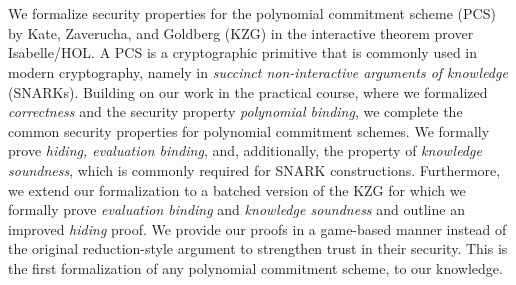\chapter{\abstractname}

We formalize security properties for the polynomial commitment scheme (PCS) by Kate, Zaverucha, and Goldberg (KZG) in the interactive theorem prover Isabelle/HOL. A PCS is a cryptographic primitive that is commonly used in modern cryptography, namely in \textit{succinct non-interactive arguments of knowledge} (SNARKs). 
Building on our work in the practical course, where we formalized \textit{correctness} and the security property \textit{polynomial binding}, we complete the common security properties for polynomial commitment schemes. We formally prove \textit{hiding, evaluation binding}, and, additionally, the property of \textit{knowledge soundness}, which is commonly required for SNARK constructions.
Furthermore, we extend our formalization to a batched version of the KZG for which we formally prove \textit{evaluation binding} and \textit{knowledge soundness} and outline an improved \textit{hiding} proof.
We provide our proofs in a game-based manner instead of the original reduction-style argument to strengthen trust in their security.
This is the first formalization of any polynomial commitment scheme, to our knowledge. 